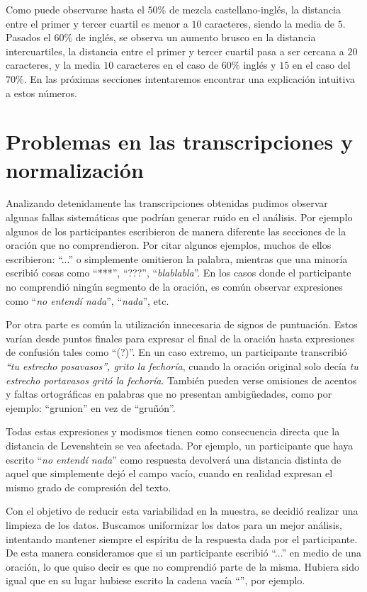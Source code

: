 Como puede observarse hasta el $50\%$ de mezcla castellano-inglés, la distancia entre el primer y tercer cuartil es menor a $10$ caracteres, siendo la media de $5$. Pasados el $60\%$ de inglés, se observa un aumento brusco en la distancia intercuartiles, la distancia entre el primer y tercer cuartil pasa a ser cercana a $20$ caracteres, y la media $10$ caracteres en el caso de $60\%$ inglés y $15$ en el caso del $70\%$. En las próximas secciones intentaremos encontrar una explicación intuitiva a estos números.

\section{Problemas en las transcripciones y normalización}

Analizando detenidamente las transcripciones obtenidas pudimos observar algunas fallas sistemáticas que podrían generar ruido en el análisis. Por ejemplo algunos de los participantes escribieron de manera diferente las secciones de la oración que no comprendieron. Por citar algunos ejemplos, muchos de ellos escribieron: ``...'' o simplemente omitieron la palabra, mientras que una minoría escribió cosas como ``***'', ``???'', ``\textit{blablabla}''. En los casos donde el participante no comprendió ningún segmento de la oración, es común observar expresiones como ``\textit{no entendí nada}'', ``\textit{nada}'', etc.

Por otra parte es común la utilización innecesaria de signos de puntuación. Estos varían desde puntos finales para expresar el final de la oración hasta expresiones de confusión tales como ``(?)''. En un caso extremo, un participante transcribió \textit{``tu estrecho posavasos'', grito la fechoría}, cuando la oración original solo decía \textit{tu estrecho portavasos gritó la fechoría}.
También pueden verse omisiones de acentos y faltas ortográficas en palabras que no presentan ambigüedades, como por ejemplo: ``grunion'' en vez de ``gruñón''.

Todas estas expresiones y modismos tienen como consecuencia directa que la distancia de Levenshtein se vea afectada. Por ejemplo, un participante que haya escrito ``\textit{no entendí nada}'' como respuesta devolverá una distancia distinta de aquel que simplemente dejó el campo vacío, cuando en realidad expresan el mismo grado de compresión del texto.

Con el objetivo de reducir esta variabilidad en la muestra, se decidió realizar una limpieza de los datos. Buscamos uniformizar los datos para un mejor análisis, intentando mantener siempre el espíritu de la respuesta dada por el participante. De esta manera consideramos que si un participante escribió ``...'' en medio de una oración, lo que quiso decir es que no comprendió parte de la misma. Hubiera sido igual que en su lugar hubiese escrito la cadena vacía ``'', por ejemplo.

